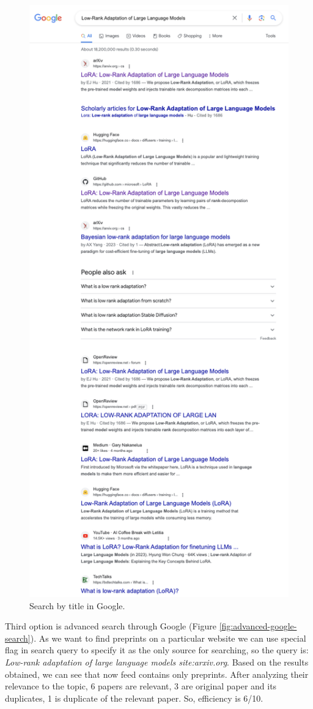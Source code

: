 \documentclass{article}
\begin{document}
    \begin{figure}[H]
        \centering
        \includegraphics[width=0.65\linewidth]{img/search_google.png}
        \caption{Search by title in Google.}
        \label{fig:google-search}
    \end{figure}

    Third option is advanced search through Google (Figure \ref{fig:advanced-google-search}). As we want to find preprints on a particular website we can use special flag in search query to specify it as the only source for searching, so the query is: \textit{Low-rank adaptation of large language models site:arxiv.org}. Based on the results obtained, we can see that now feed contains only preprints. After analyzing their relevance to the topic, 6 papers are relevant, 3 are original paper and its duplicates, 1 is duplicate of the relevant paper. So, efficiency is 6/10.
\end{document}
